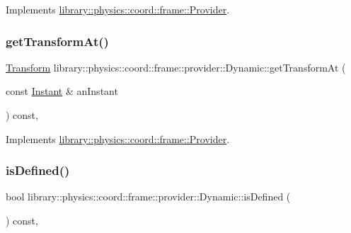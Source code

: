 Implements \hyperlink{classlibrary_1_1physics_1_1coord_1_1frame_1_1_provider_ab8eee40c8ef4aee0b57bedf458f4934e}{library\+::physics\+::coord\+::frame\+::\+Provider}.

\mbox{\label{classlibrary_1_1physics_1_1coord_1_1frame_1_1provider_1_1_dynamic_af9d9f53d8269f24b6694494e5128f11e}} 
\subsubsection{\texorpdfstring{get\+Transform\+At()}{getTransformAt()}}
{\footnotesize\ttfamily \hyperlink{classlibrary_1_1physics_1_1coord_1_1_transform}{Transform} library\+::physics\+::coord\+::frame\+::provider\+::\+Dynamic\+::get\+Transform\+At (\begin{DoxyParamCaption}\item[{const \hyperlink{classlibrary_1_1physics_1_1time_1_1_instant}{Instant} \&}]{an\+Instant }\end{DoxyParamCaption}) const\hspace{0.3cm}{\ttfamily [override]}, {\ttfamily [virtual]}}



Implements \hyperlink{classlibrary_1_1physics_1_1coord_1_1frame_1_1_provider_a796fd2dd337f1304a0e9acf573ce2550}{library\+::physics\+::coord\+::frame\+::\+Provider}.

\mbox{\label{classlibrary_1_1physics_1_1coord_1_1frame_1_1provider_1_1_dynamic_a0527b3fd86cdd8070f1697c057f06479}} 
\subsubsection{\texorpdfstring{is\+Defined()}{isDefined()}}
{\footnotesize\ttfamily bool library\+::physics\+::coord\+::frame\+::provider\+::\+Dynamic\+::is\+Defined (\begin{DoxyParamCaption}{ }\end{DoxyParamCaption}) const\hspace{0.3cm}{\ttfamily [override]}, {\ttfamily [virtual]}}



